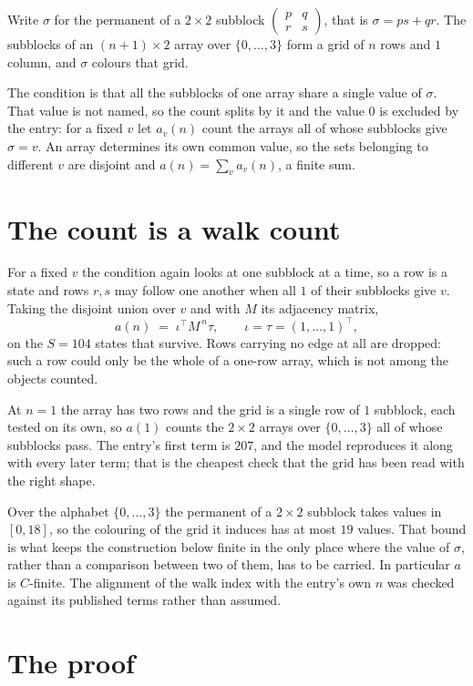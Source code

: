 \documentclass[11pt,a4paper]{article}
\theoremstyle{plain}
\theoremstyle{definition}
\begin{document}
Write $\sigma$ for the permanent of a $2\times2$ subblock
$\begin{pmatrix}p&q\\r&s\end{pmatrix}$, that is $\sigma=ps+qr$. The subblocks of an
$(n+1)\times2$ array over $\{0,\dots,3\}$ form a grid of $n$ rows and $1$
column, and $\sigma$ colours that grid.

The condition is that all the subblocks of one array share a single value of $\sigma$. That
value is not named, so the count splits by it and the value $0$ is excluded by the entry: for a fixed $v$ let $a_v(n)$ count the
arrays all of whose subblocks give $\sigma=v$. An array determines its own common value, so
the sets belonging to different $v$ are disjoint and $a(n)=\sum_v a_v(n)$, a finite sum.

\section{The count is a walk count}

For a fixed $v$ the condition again looks at one subblock at a time, so a
row is a state and rows $r,s$ may follow one another when all $1$ of their subblocks give
$v$. Taking the disjoint union over $v$ and with $M$ its adjacency matrix,
\[
a(n)\;=\;\iota^{\!\top}M^{\,n}\tau,\qquad\iota=\tau=(1,\dots,1)^{\!\top},
\]
on the $S=104$ states that survive. Rows carrying no edge at all are dropped: such a row could
only be the whole of a one-row array, which is not among the objects counted.

At $n=1$ the array has two rows and the grid is a single row of $1$
subblock, each tested on its own, so $a(1)$ counts the
$2\times2$ arrays over $\{0,\dots,3\}$ all of whose subblocks pass. The entry's
first term is $207$, and the model reproduces it along with every later term; that is the
cheapest check that the grid has been read with the right shape.

Over the alphabet $\{0,\dots,3\}$ the permanent of a $2\times2$ subblock takes values in
$[0,18]$, so the colouring of the grid it induces has at most $19$ values.
That bound is what keeps the construction below finite in the only place where the value of
$\sigma$, rather than a comparison between two of them, has to be carried.
In particular $a$ is $C$-finite. The alignment of the walk index with the entry's own $n$ was
checked against its published terms rather than assumed.

\section{The proof}
\end{document}
